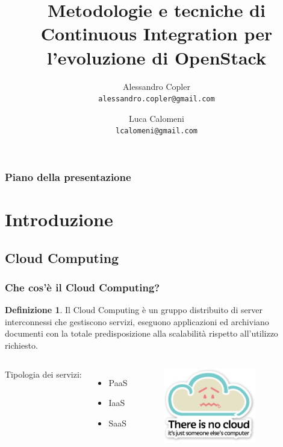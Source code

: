 \documentclass{beamer}
\title{Metodologie e tecniche di Continuous Integration per l'evoluzione di OpenStack}
\author[A.Copler e L.Calomeni]{
  Alessandro Copler\\
  \texttt{alessandro.copler@gmail.com}\\
  \and
  Luca Calomeni\\
  \texttt{lcalomeni@gmail.com}
}
\institute[UniDiBergamo]{Università degli studi di Bergamo - Facolta di Ingegneria}
\theoremstyle{definition}
\newtheorem{definizione}{Definizione}
\theoremstyle{plain}
\begin{document}
\begin{frame}
\maketitle
\end{frame}


\begin{frame}
\frametitle{Piano della presentazione}
\tableofcontents
\end{frame}

\section{Introduzione}

\subsection{Cloud
Computing}



\begin{frame}
\frametitle{Che cos'è il Cloud Computing?}
\begin{definizione}

Il \alert{Cloud Computing} è un gruppo distribuito di server interconnessi che gestiscono servizi, eseguono applicazioni ed archiviano documenti con la totale predisposizione alla scalabilità rispetto all'utilizzo richiesto.
\end{definizione}
\begin{columns}
Tipologia dei servizi:
\begin{itemize}
\item
PaaS
\item
IaaS
\item
SaaS
\end{itemize}
\begin{figure}[!h]
	\begin{center}
\includegraphics[width=4cm]{cloud2.png}
\end{center}
\end{figure}

\end{columns}

\end{frame}
\end{document}
